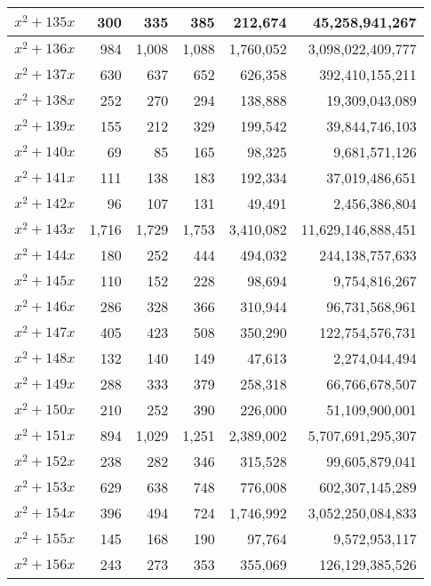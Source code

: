 \documentclass[a4paper]{amsproc}
\theoremstyle{plain}
\theoremstyle{named}
\begin{document}
\begin{longtable}{ | l | r | r | r | r | r | }
$x^2 + 135x$ & 300 & 335 & 385 & 212{,}674 & 45{,}258{,}941{,}267 \\ \hline
$x^2 + 136x$ & 984 & 1{,}008 & 1{,}088 & 1{,}760{,}052 & 3{,}098{,}022{,}409{,}777 \\ \hline
$x^2 + 137x$ & 630 & 637 & 652 & 626{,}358 & 392{,}410{,}155{,}211 \\ \hline
$x^2 + 138x$ & 252 & 270 & 294 & 138{,}888 & 19{,}309{,}043{,}089 \\ \hline
$x^2 + 139x$ & 155 & 212 & 329 & 199{,}542 & 39{,}844{,}746{,}103 \\ \hline
$x^2 + 140x$ & 69 & 85 & 165 & 98{,}325 & 9{,}681{,}571{,}126 \\ \hline
$x^2 + 141x$ & 111 & 138 & 183 & 192{,}334 & 37{,}019{,}486{,}651 \\ \hline
$x^2 + 142x$ & 96 & 107 & 131 & 49{,}491 & 2{,}456{,}386{,}804 \\ \hline
$x^2 + 143x$ & 1{,}716 & 1{,}729 & 1{,}753 & 3{,}410{,}082 & 11{,}629{,}146{,}888{,}451 \\ \hline
$x^2 + 144x$ & 180 & 252 & 444 & 494{,}032 & 244{,}138{,}757{,}633 \\ \hline
$x^2 + 145x$ & 110 & 152 & 228 & 98{,}694 & 9{,}754{,}816{,}267 \\ \hline
$x^2 + 146x$ & 286 & 328 & 366 & 310{,}944 & 96{,}731{,}568{,}961 \\ \hline
$x^2 + 147x$ & 405 & 423 & 508 & 350{,}290 & 122{,}754{,}576{,}731 \\ \hline
$x^2 + 148x$ & 132 & 140 & 149 & 47{,}613 & 2{,}274{,}044{,}494 \\ \hline
$x^2 + 149x$ & 288 & 333 & 379 & 258{,}318 & 66{,}766{,}678{,}507 \\ \hline
$x^2 + 150x$ & 210 & 252 & 390 & 226{,}000 & 51{,}109{,}900{,}001 \\ \hline
$x^2 + 151x$ & 894 & 1{,}029 & 1{,}251 & 2{,}389{,}002 & 5{,}707{,}691{,}295{,}307 \\ \hline
$x^2 + 152x$ & 238 & 282 & 346 & 315{,}528 & 99{,}605{,}879{,}041 \\ \hline
$x^2 + 153x$ & 629 & 638 & 748 & 776{,}008 & 602{,}307{,}145{,}289 \\ \hline
$x^2 + 154x$ & 396 & 494 & 724 & 1{,}746{,}992 & 3{,}052{,}250{,}084{,}833 \\ \hline
$x^2 + 155x$ & 145 & 168 & 190 & 97{,}764 & 9{,}572{,}953{,}117 \\ \hline
$x^2 + 156x$ & 243 & 273 & 353 & 355{,}069 & 126{,}129{,}385{,}526 \\ \hline

\end{longtable}
\end{document}
